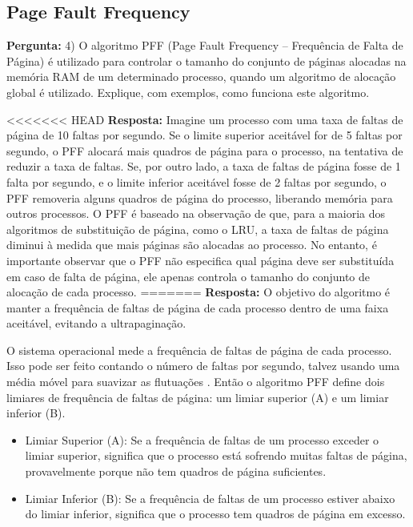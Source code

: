 \documentclass{article}
\begin{document}
\subsection{Page Fault Frequency}

\textbf{Pergunta:} 4) O algoritmo PFF (Page Fault Frequency – Frequência de Falta de Página) é utilizado para controlar o tamanho do conjunto de páginas alocadas na memória RAM de um determinado processo, quando um algoritmo de alocação global é utilizado. Explique, com exemplos, como funciona este algoritmo.  \newline

<<<<<<< HEAD
\textbf{Resposta:} Imagine um processo com uma taxa de faltas de página de 10 faltas por segundo. Se o limite superior aceitável for de 5 faltas por segundo, o PFF alocará mais quadros de página para o processo, na tentativa de reduzir a taxa de faltas. Se, por outro lado, a taxa de faltas de página fosse de 1 falta por segundo, e o limite inferior aceitável fosse de 2 faltas por segundo, o PFF removeria alguns quadros de página do processo, liberando memória para outros processos.
O PFF é baseado na observação de que, para a maioria dos algoritmos de substituição de página, como o LRU, a taxa de faltas de página diminui à medida que mais páginas são alocadas ao processo. No entanto, é importante observar que o PFF não especifica qual página deve ser substituída em caso de falta de página, ele apenas controla o tamanho do conjunto de alocação de cada processo.
=======
\textbf{Resposta:} O objetivo do algoritmo é manter a frequência de faltas de página de cada processo dentro de uma faixa aceitável, evitando a ultrapaginação.

O sistema operacional mede a frequência de faltas de página de cada processo. Isso pode ser feito contando o número de faltas por segundo, talvez usando uma média móvel para suavizar as flutuações \textcite[p. 155]{tanenbaum2021}. Então o algoritmo PFF define dois limiares de frequência de faltas de página: um limiar superior (A) e um limiar inferior (B). 
  
\begin{itemize}
  \item Limiar Superior (A): Se a frequência de faltas de um processo exceder o limiar superior, significa que o processo está sofrendo muitas faltas de página, provavelmente porque não tem quadros de página suficientes.
  \item Limiar Inferior (B): Se a frequência de faltas de um processo estiver abaixo do limiar inferior, significa que o processo tem quadros de página em excesso.
\end{itemize}
\end{document}
